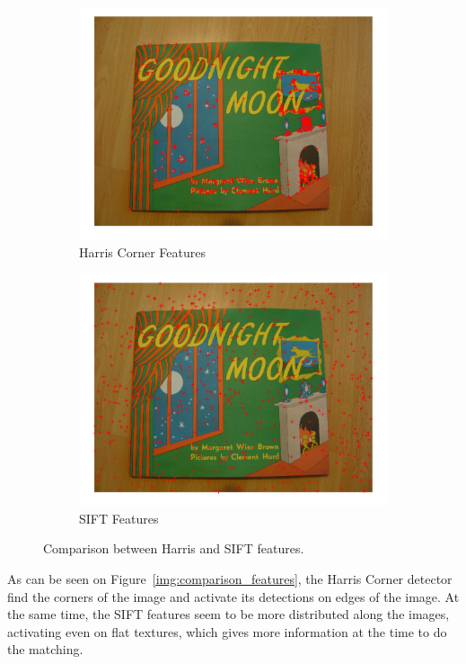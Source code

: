 \documentclass{ethz_report}
\begin{document}
\begin{figure}[H]
\centering
\begin{subfigure}[b]{.5\textwidth}
  \centering
  \includegraphics[width=1\linewidth]{images/corners1}
  \caption{Harris Corner Features}
\end{subfigure}%
\begin{subfigure}[b]{.5\textwidth}
  \centering
  \includegraphics[width=1\linewidth]{images/sift1}
  \caption{SIFT Features}
\end{subfigure}
\caption{Comparison between Harris and SIFT features.}
\end{figure}
\label{img:comparison_features}

As can be seen on Figure~\ref{img:comparison_features}, the Harris Corner detector find the corners
of the image and activate its detections on edges of the image. At the same time, the SIFT features
seem to be more distributed along the images, activating even on flat textures, which gives more
information at the time to do the matching.
\end{document}
